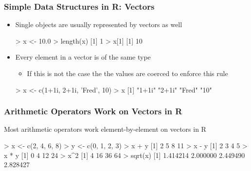 \documentclass{beamer}
\begin{document}
\begin{frame}[fragile]
  \frametitle{Simple Data Structures in R: Vectors}

\begin{itemize}

\item Single objects are usually represented by vectors as well
\begin{Rcode}
> x <- 10.0
> length(x)
[1] 1
> x[1]
[1] 10
\end{Rcode}


\item Every element in a vector is of the same type

\begin{itemize}
	\item If this is not the case the the values are coerced to enforce this rule
\end{itemize}

\begin{Rcode}
> x <- c(1+1i, 2+1i, 'Fred', 10)
> x
[1] "1+1i" "2+1i" "Fred" "10"
\end{Rcode}

\end{itemize}

\end{frame}


\begin{frame}[fragile]
  \frametitle{Arithmetic Operators Work on Vectors in R}

Most arithmetic operators work element-by-element on vectors in R

\begin{Rcode}
> x <- c(2, 4, 6, 8)
> y <- c(0, 1, 2, 3)
> x + y
[1]  2  5  8 11
> x - y
[1] 2 3 4 5
> x * y
[1]  0  4 12 24
> x^2
[1]  4 16 36 64
> sqrt(x)
[1] 1.414214 2.000000 2.449490 2.828427
\end{Rcode}

\end{frame}
\end{document}
